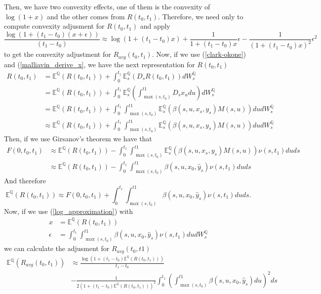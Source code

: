 \documentclass[a4paper,10pt]{article}
\newcommand{\1}{\mathbf{1}}
\begin{document}
Then, we have two convexity effects, one of them is the convexity of $\log(1+x)$ and the other comes from $R(t_0,t_1)$. Therefore, we need only to compute convexity adjusment for $R(t_0,t_1)$ and apply 
\begin{equation}\label{log_approximation}
\frac{\log(1 + (t_1 - t_0)(x +\epsilon))}{(t_1 - t_0)} \approx \log(1 + (t_1 - t_0)x) + \frac{1}{1 + (t_1 - t_0)x}   \epsilon - \frac{1}{(1 + (t_1 - t_0)x)^{2}} \epsilon^{2}
\end{equation}
to get the convexity adjustment for $R_{avg}(t_0,t_1)$. Now, if we use (\ref{clark-okone}) and (\ref{malliavin_derive_x}, we have the next representation for $R(t_0,t_1)$ 
\begin{align*}
R(t_0,t_1) &=   \mathbb{E}^{\mathbb{Q}}\left(R(t_0,t_1) \right) + \int_{0}^{t_1}\mathbb{E}^{\mathbb{Q}}_s\left(D_s R(t_0,t_1) \right) dW^{\mathbb{Q}}_s \\
&= \mathbb{E}^{\mathbb{Q}}\left(R(t_0,t_1) \right) + \int_{0}^{t_1}\mathbb{E}^{\mathbb{Q}}_s\left(\int_{\max(s,t_0)}^{t1} D_s x_u du \right) dW^{\mathbb{Q}}_s \\
&= \mathbb{E}^{\mathbb{Q}}\left(R(t_0,t_1) \right) + \int_{0}^{t_1}\int_{\max(s,t_0)}^{t1} \mathbb{E}^{\mathbb{Q}}_s\left(\beta(s,u, x_s, y_s)M(s,u)  \right) du  dW^{\mathbb{Q}}_s\\
&\approx \mathbb{E}^{\mathbb{Q}}\left(R(t_0,t_1) \right) + \int_{0}^{t_1}\int_{\max(s,t_0)}^{t1} \mathbb{E}^{\mathbb{Q}}_s\left(\beta(s,u, x_s, y_s)M(s,u)  \right) du  dW^{\mathbb{Q}}_s
\end{align*}
Then, if we use Girsanov's theorem we have that
\begin{align*}
F(0,t_0,t_1) &\approx \mathbb{E}^{\mathbb{Q}}\left(R(t_0,t_1) \right) - \int_{0}^{t_1}\int_{\max(s,t_0)}^{t1} \mathbb{E}^{\mathbb{Q}}_s\left(\beta(s,u, x_s, y_s)M(s,u)  \right) \nu(s,t_1)  du ds \\
&\approx \mathbb{E}^{\mathbb{Q}}\left(R(t_0,t_1) \right) - \int_{0}^{t_1}\int_{\max(s,t_0)}^{t1}  \beta(s,u, x_0, \hat{y}_s) \nu(s,t_1)  du ds  
\end{align*}
And therefore
\begin{equation}\label{convexity_ois_future}
 \mathbb{E}^{\mathbb{Q}}\left(R(t_0,t_1) \right) \approx F(0,t_0,t_1) + \int_{0}^{t_1}\int_{\max(s,t_0)}^{t1}  \beta(s,u, x_0, \hat{y}_s) \nu(s,t_1)  du ds.
\end{equation}
Now, if we use (\ref{log_approximation}) with 
\begin{align*}
x &= \mathbb{E}^{\mathbb{Q}}\left(R(t_0,t_1) \right)\\
\epsilon &= \int_{0}^{t_1}\int_{\max(s,t_0)}^{t1}  \beta(s,u, x_0, \hat{y}_s) \nu(s,t_1)  du  dW^{\mathbb{Q}}_s
\end{align*} 
we can calculate the adjusment for $R_{avg}(t_0,t1)$
\begin{align*}
\mathbb{E}^{\mathbb{Q}}\left(R_{avg}(t_0,t_1) \right) &\approx \frac{\log\left(1+(t_1 - t_0)\mathbb{E}^{\mathbb{Q}}\left(R(t_0,t_1)\right)\right)}{t_1 - t_0} \\
&-\frac{1}{2(1 + (t_1 - t_0)\mathbb{E}^{\mathbb{Q}}\left(R(t_0,t_1)\right))^{2}} \int_{0}^{t_1}\left(\int_{\max(s,t_0)}^{t1}  \beta(s,u, x_0, \hat{y}_s)  du\right)^{2} ds
\end{align*}
\end{document}
